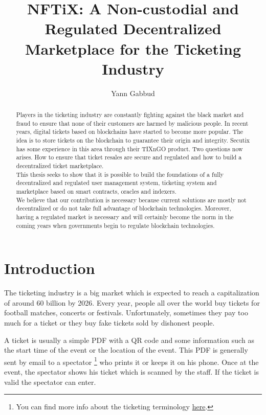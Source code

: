 \documentclass[a4paper,11pt,oneside]{report}
\title{NFTiX: A Non-custodial and Regulated Decentralized Marketplace for the Ticketing Industry}
\author{Yann Gabbud}
\affiliation{Distributed Computing Laboratory \\
and \\
Secutix SA, an ELCA company \\}
\begin{document}
\maketitle
\makeacks

\begin{abstract}
Players in the ticketing industry are constantly fighting against the black market and fraud to ensure that none of their customers are harmed by malicious people. In recent years, digital tickets based on blockchains have started to become more popular. The idea is to store tickets on the blockchain to guarantee their origin and integrity. Secutix has some experience in this area through their TIXnGO product. Two questions now arises. How to ensure that ticket resales are secure and regulated and how to build a decentralized ticket marketplace. \\

This thesis seeks to show that it is possible to build the foundations of a fully decentralized and regulated user management system, ticketing system and marketplace based on smart contracts, oracles and indexers. \\

We believe that our contribution is necessary because current solutions are mostly not decentralized or do not take full advantage of blockchain technologies. Moreover, having a regulated market is necessary and will certainly become the norm in the coming years when governments begin to regulate blockchain technologies. \\
\end{abstract}

\maketoc

\chapter{Introduction}
The ticketing industry is a big market which is expected to reach a capitalization of around 60 billion by 2026. Every year, people all over the world buy tickets for football matches, concerts or festivals. Unfortunately, sometimes they pay too much for a ticket or they buy fake tickets sold by dishonest people.

A ticket is usually a simple PDF with a QR code and some information such as the start time of the event or the location of the event. This PDF is generally sent by email to a spectator \footnote{You can find more info about the ticketing terminology \hyperref[sec:ticketing_terminology]{here}.} who prints it or keeps it on his phone. Once at the event, the spectator shows his ticket which is scanned by the staff. If the ticket is valid the spectator can enter.
\end{document}
